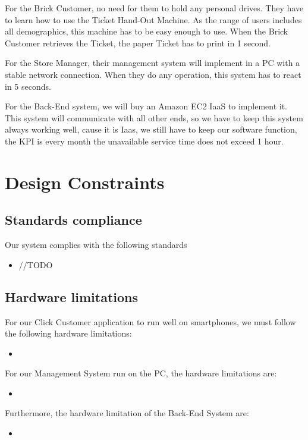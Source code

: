 \documentclass[a4paper,12pt]{report}
\begin{document}
For the Brick Customer, no need for them to hold any personal drives. They have to learn how to use the Ticket Hand-Out Machine. As the range of users includes all demographics, this machine has to be easy enough to use. When the Brick Customer retrieves the Ticket, the paper Ticket has to print in 1 second.

For the Store Manager, their management system will implement in a PC with a stable network connection. When they do any operation, this system has to react in 5 seconds.

For the Back-End system, we will buy an Amazon EC2 IaaS to implement it. This system will communicate with all other ends, so we have to keep this system always working well, cause it is Iaas, we still have to keep our software function, the KPI is every month the unavailable service time does not exceed 1 hour.


\section{Design Constraints}
\subsection{Standards compliance}

Our system complies with the following standards
\begin{itemize}
	\item //TODO
\end{itemize}


\subsection{Hardware limitations}

For our Click Customer application to run well on smartphones, we must follow the following hardware limitations:
\begin{itemize}
	\item 
\end{itemize}

For our Management System run on the PC, the hardware limitations are:
\begin{itemize}
	\item 
\end{itemize}

Furthermore, the hardware limitation of the Back-End System are:
\begin{itemize}
	\item 
\end{itemize}
\end{document}
